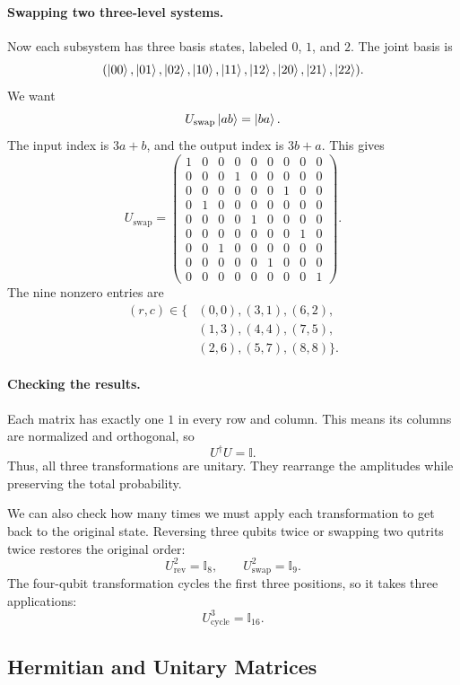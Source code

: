 \documentclass[11pt]{article}
\begin{document}
\paragraph{Swapping two three-level systems.}
Now each subsystem has three basis states, labeled
$0$, $1$, and $2$. The joint basis is
\[
(\ket{00},\ket{01},\ket{02},
 \ket{10},\ket{11},\ket{12},
 \ket{20},\ket{21},\ket{22}).
\]
We want
\[
U_{\mathrm{swap}}\ket{ab}=\ket{ba}.
\]
The input index is $3a+b$, and the output index is
$3b+a$. This gives
\[
U_{\mathrm{swap}}=
\begin{pmatrix}
1&0&0&0&0&0&0&0&0\\
0&0&0&1&0&0&0&0&0\\
0&0&0&0&0&0&1&0&0\\
0&1&0&0&0&0&0&0&0\\
0&0&0&0&1&0&0&0&0\\
0&0&0&0&0&0&0&1&0\\
0&0&1&0&0&0&0&0&0\\
0&0&0&0&0&1&0&0&0\\
0&0&0&0&0&0&0&0&1
\end{pmatrix}.
\]
The nine nonzero entries are
\[
\begin{aligned}
(r,c)\in\{&
(0,0),(3,1),(6,2),\\
&(1,3),(4,4),(7,5),\\
&(2,6),(5,7),(8,8)\}.
\end{aligned}
\]

\paragraph{Checking the results.}
Each matrix has exactly one $1$ in every row and column.
This means its columns are normalized and orthogonal,
so
\[
U^\dagger U=\mathbb{I}.
\]
Thus, all three transformations are unitary. They
rearrange the amplitudes while preserving the total
probability.

We can also check how many times we must apply each
transformation to get back to the original state.
Reversing three qubits twice or swapping two qutrits
twice restores the original order:
\[
U_{\mathrm{rev}}^2=\mathbb{I}_8,
\qquad
U_{\mathrm{swap}}^2=\mathbb{I}_9.
\]
The four-qubit transformation cycles the first three
positions, so it takes three applications:
\[
U_{\mathrm{cycle}}^3=\mathbb{I}_{16}.
\]

\setcounter{subsection}{2}
\subsection{Hermitian and Unitary Matrices}
\end{document}
